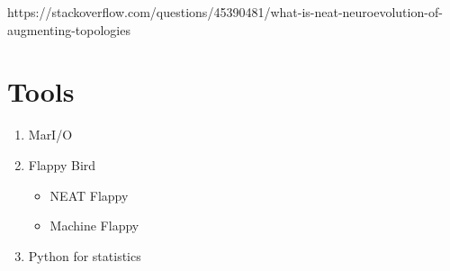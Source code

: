 https://stackoverflow.com/questions/45390481/what-is-neat-neuroevolution-of-augmenting-topologies


\section{Tools}
\label{sec:related:tools}

\begin{enumerate}
	\item MarI/O
	\item Flappy Bird
	\begin{itemize}
		\item NEAT Flappy
		\item Machine Flappy
	\end{itemize}
	\item Python for statistics
\end{enumerate}

